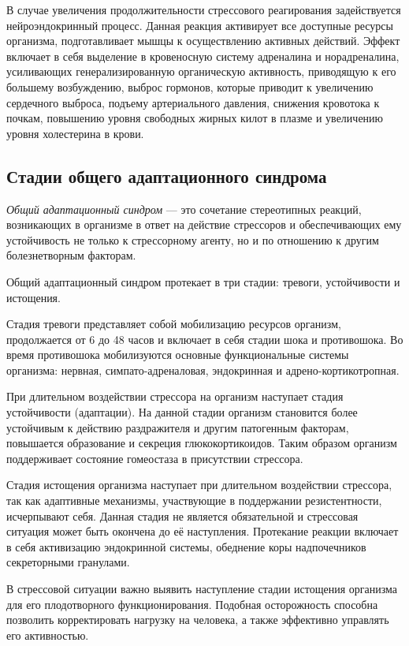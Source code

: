 В случае увеличения продолжительности стрессового реагирования задействуется нейроэндокринный процесс. Данная реакция активирует все доступные ресурсы организма, подготавливает мышцы к осуществлению активных действий. Эффект включает в себя выделение в кровеносную систему адреналина и норадреналина, усиливающих генерализированную органическую активность, приводящую к его большему возбуждению, выброс гормонов, которые приводит к увеличению сердечного выброса, подъему артериального давления, снижения кровотока к почкам, повышению уровня свободных жирных килот в плазме и увеличению уровня холестерина в крови. \cite{neuroPhysicalMechasmsOfStress}

\subsection{Стадии общего адаптационного синдрома}

\textit{Общий адаптационный синдром} --- это сочетание стереотипных реакций, возникающих в организме в ответ на действие стрессоров и обеспечивающих ему устойчивость не только к стрессорному агенту, но и по отношению к другим болезнетворным факторам. \cite{stressAndPatology}

Общий адаптационный синдром протекает в три стадии: тревоги, устойчивости и истощения.

Стадия тревоги представляет собой мобилизацию ресурсов организм, продолжается от 6 до 48 часов и включает в себя стадии шока и противошока. Во время противошока мобилизуются основные функциональные системы организма: нервная, симпато-адреналовая, эндокринная и адрено-кортикотропная. \cite{stressAndPatology}

При длительном воздействии стрессора на организм наступает стадия устойчивости (адаптации). На данной стадии организм становится более устойчивым к действию раздражителя и другим патогенным факторам, повышается образование и секреция глюкокортикоидов. Таким образом организм поддерживает состояние гомеостаза в присутствии стрессора. \cite{stressAndPatology}

Стадия истощения организма наступает при длительном воздействии стрессора, так как адаптивные механизмы, участвующие в поддержании резистентности, исчерпывают себя. Данная стадия не является обязательной и стрессовая ситуация может быть окончена до её наступления. Протекание реакции включает в себя активизацию эндокринной системы, обеднение коры надпочечников секреторными гранулами. \cite{stressAndPatology}

В стрессовой ситуации важно выявить наступление стадии истощения организма для его плодотворного функционирования. Подобная осторожность способна позволить корректировать нагрузку на человека, а также эффективно управлять его активностью.

